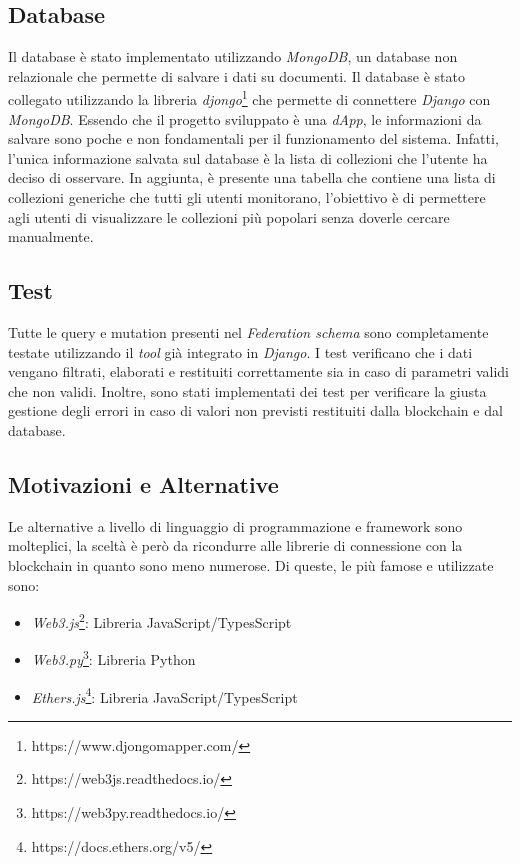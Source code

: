 \subsection{Database}

Il database è stato implementato utilizzando \textit{MongoDB}, un database non relazionale che permette di salvare i dati su documenti. Il database è stato collegato utilizzando la libreria \textit{djongo}\footnote{https://www.djongomapper.com/} che permette di connettere \textit{Django} con \textit{MongoDB}. Essendo che il progetto sviluppato è una \textit{dApp}, le informazioni da salvare sono poche e non fondamentali per il funzionamento del sistema. Infatti, l'unica informazione salvata sul database è la lista di collezioni che l'utente ha deciso di osservare. In aggiunta, è presente una tabella che contiene una lista di collezioni generiche che tutti gli utenti monitorano, l'obiettivo è di permettere agli utenti di visualizzare le collezioni più popolari senza doverle cercare manualmente.

\subsection{Test}

Tutte le query e mutation presenti nel \textit{Federation schema} sono completamente testate utilizzando il \textit{tool} già integrato in \textit{Django}. I test verificano che i dati vengano filtrati, elaborati e restituiti correttamente sia in caso di parametri validi che non validi. Inoltre, sono stati implementati dei test per verificare la giusta gestione degli errori in caso di valori non previsti restituiti dalla blockchain e dal database.

\subsection{Motivazioni e Alternative}

Le alternative a livello di linguaggio di programmazione e framework sono molteplici, la sceltà è però da ricondurre alle librerie di connessione con la blockchain in quanto sono meno numerose. Di queste, le più famose e utilizzate sono:

\begin{itemize}
    \item \textit{Web3.js}\footnote{https://web3js.readthedocs.io/}: Libreria JavaScript/TypesScript
    \item \textit{Web3.py}\footnote{https://web3py.readthedocs.io/}: Libreria Python
    \item \textit{Ethers.js}\footnote{https://docs.ethers.org/v5/}: Libreria JavaScript/TypesScript
\end{itemize}

